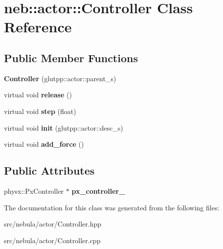 \hypertarget{classneb_1_1actor_1_1Controller}{
\section{neb::actor::Controller Class Reference}
\label{classneb_1_1actor_1_1Controller}
}
\subsection*{Public Member Functions}
\begin{DoxyCompactItemize}
\item 
\hypertarget{classneb_1_1actor_1_1Controller_aeedad5d671d8d4bc4398efd7be7fc005}{
{\bfseries Controller} (glutpp::actor::parent\_\-s)}
\label{classneb_1_1actor_1_1Controller_aeedad5d671d8d4bc4398efd7be7fc005}

\item 
\hypertarget{classneb_1_1actor_1_1Controller_ac6f5996da2aea174de794de4ffc647f4}{
virtual void {\bfseries release} ()}
\label{classneb_1_1actor_1_1Controller_ac6f5996da2aea174de794de4ffc647f4}

\item 
\hypertarget{classneb_1_1actor_1_1Controller_a95830d761987167e8ab122f3ca16346f}{
virtual void {\bfseries step} (float)}
\label{classneb_1_1actor_1_1Controller_a95830d761987167e8ab122f3ca16346f}

\item 
\hypertarget{classneb_1_1actor_1_1Controller_aad1420da60579f17c8dec8dad2a517bb}{
virtual void {\bfseries init} (glutpp::actor::desc\_\-s)}
\label{classneb_1_1actor_1_1Controller_aad1420da60579f17c8dec8dad2a517bb}

\item 
\hypertarget{classneb_1_1actor_1_1Controller_ab8ab78f513b014f112895de7dad43040}{
virtual void {\bfseries add\_\-force} ()}
\label{classneb_1_1actor_1_1Controller_ab8ab78f513b014f112895de7dad43040}

\end{DoxyCompactItemize}
\subsection*{Public Attributes}
\begin{DoxyCompactItemize}
\item 
\hypertarget{classneb_1_1actor_1_1Controller_af166ab349a8e62aa9f8f7c79a659e1f3}{
physx::PxController $\ast$ {\bfseries px\_\-controller\_\-}}
\label{classneb_1_1actor_1_1Controller_af166ab349a8e62aa9f8f7c79a659e1f3}

\end{DoxyCompactItemize}


The documentation for this class was generated from the following files:\begin{DoxyCompactItemize}
\item 
src/nebula/actor/Controller.hpp\item 
src/nebula/actor/Controller.cpp\end{DoxyCompactItemize}
